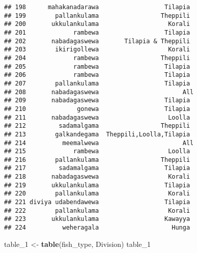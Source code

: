 \documentclass[
]{article}
\newenvironment{Shaded}{\begin{snugshade}}{\end{snugshade}}
\newcommand{\FunctionTok}[1]{\textcolor[rgb]{0.13,0.29,0.53}{\textbf{#1}}}
\newcommand{\NormalTok}[1]{#1}
\newcommand{\OtherTok}[1]{\textcolor[rgb]{0.56,0.35,0.01}{#1}}
\begin{document}
\begin{verbatim}
## 198      mahakanadarawa                  Tilapia 
## 199        pallankulama                 Theppili 
## 200       ukkulankulama                   Korali 
## 201             rambewa                  Tilapia 
## 202       nabadagaswewa       Tilapia & Theppili 
## 203        ikirigollewa                   Korali 
## 204             rambewa                 Theppili 
## 205             rambewa                  Tilapia 
## 206             rambewa                  Tilapia 
## 207        pallankulama                  Tilapia 
## 208       nabadagaswewa                       All
## 209       nabadagaswewa                  Tilapia 
## 210              gonewa                  Tilapia 
## 211       nabadagaswewa                   Loolla 
## 212         sadamalgama                 Theppili 
## 213        galkandegama  Theppili,Loolla,Tilapia 
## 214          meemalwewa                       All
## 215             rambewa                   Loolla 
## 216        pallankulama                 Theppili 
## 217         sadamalgama                  Tilapia 
## 218       nabadagaswewa                   Korali 
## 219       ukkulankulama                  Tilapia 
## 220        pallankulama                   Korali 
## 221 diviya udabendawewa                  Tilapia 
## 222        pallankulama                   Korali 
## 223       ukkulankulama                  Kawayya 
## 224          weheragala                    Hunga
\end{verbatim}

\begin{Shaded}
\begin{Highlighting}[]
\NormalTok{table\_1 }\OtherTok{\textless{}{-}} \FunctionTok{table}\NormalTok{(fish\_type, Division)}
\NormalTok{table\_1}
\end{Highlighting}
\end{Shaded}
\end{document}
